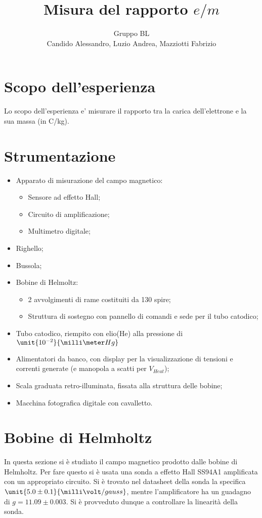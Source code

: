 \documentclass[10pt,a4paper]{article}
\title{Misura del rapporto $e/m$}
\author{Gruppo BL \\ Candido Alessandro, Luzio Andrea, Mazziotti Fabrizio}
\begin{document}
\maketitle

\section{Scopo dell'esperienza}
Lo scopo dell’esperienza e’ misurare il rapporto tra la carica dell’elettrone e la sua massa (in C/kg).

\section{Strumentazione}
\begin{itemize}
	\item Apparato di misurazione del campo magnetico:
		\begin{itemize}
			\item Sensore ad effetto Hall;
			\item Circuito di amplificazione;
			\item Multimetro digitale;
		\end{itemize}
	\item Righello;
	\item Bussola;
	\item Bobine di Helmoltz:
		\begin{itemize}
			\item 2 avvolgimenti di rame costituiti da 130 spire;
			\item Struttura di sostegno con pannello di comandi e sede per il tubo catodico;
		\end{itemize}
	\item Tubo catodico, riempito con elio(He) alla pressione di $\unit{10^{-2}}{\milli\meter Hg}$
	\item Alimentatori da banco, con display per la visualizzazione di tensioni e correnti generate (e manopola a scatti per $V_{Heat}$);
	\item Scala graduata retro-illuminata, fissata alla struttura delle bobine;
	\item Macchina fotografica digitale con cavalletto.
\end{itemize}

\section{Bobine di Helmholtz}
In questa sezione si è studiato il campo magnetico prodotto dalle bobine di Helmholtz. Per fare questo si è usata una sonda a effetto Hall SS94A1 amplificata con un appropriato circuito. Si è trovato nel datasheet della sonda la specifica $\unit{5.0 \pm 0.1}{\milli\volt/gauss}$, mentre l'amplificatore ha un guadagno di $g = 11.09 \pm 0.003$. Si è provveduto dunque a controllare la linearità della sonda.
\end{document}
